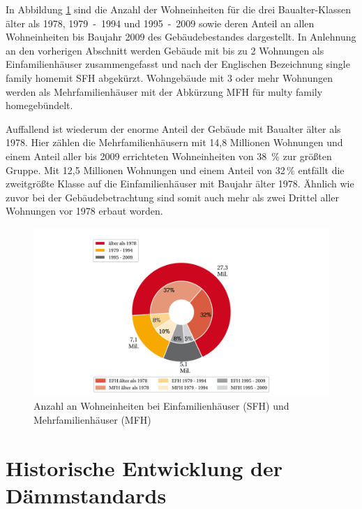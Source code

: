 In Abbildung \ref{fig: Abbildung212} sind die Anzahl der Wohneinheiten für die drei Baualter-Klassen älter als 1978, \mbox{1979 - 1994} und \mbox{1995 - 2009} sowie deren Anteil an allen Wohneinheiten bis Baujahr 2009 des Gebäudebestandes dargestellt. 
In Anlehnung an den vorherigen Abschnitt werden Gebäude mit bis zu 2 Wohnungen als Einfamilienhäuser zusammengefasst und nach der Englischen Bezeichnung \glqq single family home\grqq mit SFH abgekürzt. 
Wohngebäude mit 3 oder mehr Wohnungen werden als Mehrfamilienhäuser mit der Abkürzung MFH für \glqq multy family home\grqq gebündelt. 

Auffallend ist wiederum der enorme Anteil der Gebäude mit Baualter älter als 1978. 
Hier zählen die Mehrfamilienhäusern mit 14,8 Millionen Wohnungen und einem Anteil aller bis 2009 errichteten Wohneinheiten von \mbox{38 \%} zur größten Gruppe. 
Mit 12,5 Millionen Wohnungen und einem Anteil von 32\,\% entfällt die zweitgrößte Klasse auf die Einfamilienhäuser mit Baujahr älter 1978.
Ähnlich wie zuvor bei der Gebäudebetrachtung sind somit auch mehr als zwei Drittel aller Wohnungen vor 1978 erbaut worden.


\begin{figure}[H]
	\centering
		\includegraphics{Pictures/GebaeudeGroesse.jpg}
	\caption{Anzahl an Wohneinheiten bei Einfamilienhäuser (SFH) und Mehrfamilienhäuser (MFH) \cite{StatistischeAmterdesBundesundderLander.2014b}}
	\label{fig: Abbildung212} 
\end{figure}




\section{Historische Entwicklung der Dämmstandards}
\label{sec:Sektion 22}

